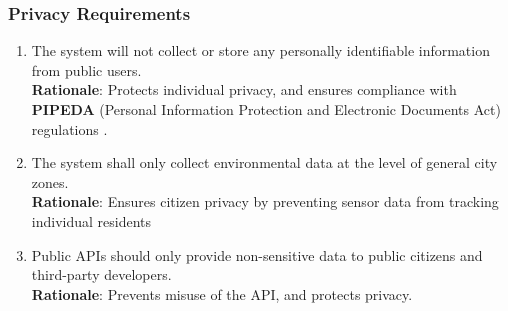 \documentclass[]{article}
\begin{document}
\subsubsection{Privacy Requirements}
\label{ssub:privacy_requirements}
\begin{enumerate}[{SR-P}1. ]
	\item The system will not collect or store any personally identifiable information from public users. \\
    \textbf{Rationale}: Protects individual privacy, and ensures compliance with \textbf{PIPEDA} (Personal Information Protection and Electronic Documents Act) regulations \cite{pipeda}.

    \item The system shall only collect environmental data at the level of general city zones. \\
    \textbf{Rationale}: Ensures citizen privacy by preventing sensor data from tracking individual residents

    \item Public APIs should only provide non-sensitive data to public citizens and third-party developers. \\
    \textbf{Rationale}: Prevents misuse of the API, and protects privacy.
    
\end{enumerate}
\end{document}
